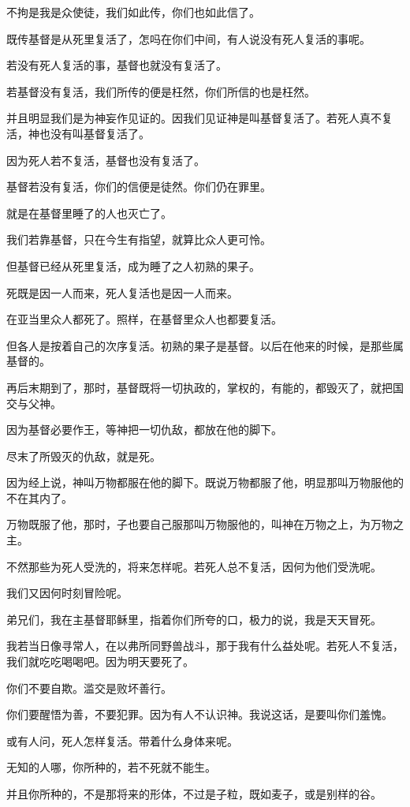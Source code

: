 \documentclass[12pt,oneside]{book}
\begin{document}
不拘是我是众使徒，我们如此传，你们也如此信了。

既传基督是从死里复活了，怎吗在你们中间，有人说没有死人复活的事呢。

若没有死人复活的事，基督也就没有复活了。

若基督没有复活，我们所传的便是枉然，你们所信的也是枉然。

并且明显我们是为神妄作见证的。因我们见证神是叫基督复活了。若死人真不复活，神也没有叫基督复活了。

因为死人若不复活，基督也没有复活了。

基督若没有复活，你们的信便是徒然。你们仍在罪里。

就是在基督里睡了的人也灭亡了。

我们若靠基督，只在今生有指望，就算比众人更可怜。

但基督已经从死里复活，成为睡了之人初熟的果子。

死既是因一人而来，死人复活也是因一人而来。

在亚当里众人都死了。照样，在基督里众人也都要复活。

但各人是按着自己的次序复活。初熟的果子是基督。以后在他来的时候，是那些属基督的。

再后末期到了，那时，基督既将一切执政的，掌权的，有能的，都毁灭了，就把国交与父神。

因为基督必要作王，等神把一切仇敌，都放在他的脚下。

尽末了所毁灭的仇敌，就是死。

因为经上说，神叫万物都服在他的脚下。既说万物都服了他，明显那叫万物服他的不在其内了。

万物既服了他，那时，子也要自己服那叫万物服他的，叫神在万物之上，为万物之主。

不然那些为死人受洗的，将来怎样呢。若死人总不复活，因何为他们受洗呢。

我们又因何时刻冒险呢。

弟兄们，我在主基督耶稣里，指着你们所夸的口，极力的说，我是天天冒死。

我若当日像寻常人，在以弗所同野兽战斗，那于我有什么益处呢。若死人不复活，我们就吃吃喝喝吧。因为明天要死了。

你们不要自欺。滥交是败坏善行。

你们要醒悟为善，不要犯罪。因为有人不认识神。我说这话，是要叫你们羞愧。

或有人问，死人怎样复活。带着什么身体来呢。

无知的人哪，你所种的，若不死就不能生。

并且你所种的，不是那将来的形体，不过是子粒，既如麦子，或是别样的谷。
\end{document}
